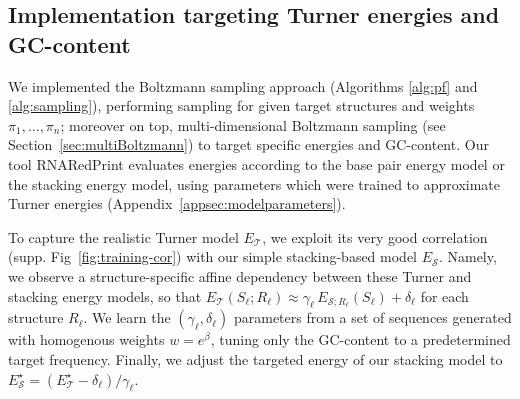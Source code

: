 \documentclass{bioinfo}
\newcommand{\Nuc}[1]{{\sf #1}}
\newcommand{\Cb}{\Nuc{C}}
\newcommand{\Gb}{\Nuc{G}}
\newcommand{\GCb}{\Gb\Cb}
\newcommand{\Software}[1]{{\ttfamily #1}}
\newcommand{\ourprog}{\Software{RNARedPrint}}
\begin{document}
\subsection{Implementation targeting Turner energies and GC-content}
We implemented the Boltzmann sampling approach (Algorithms
\ref{alg:pf} and \ref{alg:sampling}), performing sampling for given
target structures and weights $\pi_1,\dots,\pi_n$; moreover on top,
multi-dimensional Boltzmann sampling (see
Section~\ref{sec:multiBoltzmann}) to target specific energies and
\GCb-content.  Our tool \ourprog{} evaluates energies according to the base
pair energy model or the stacking energy model, using parameters which
were trained to approximate Turner energies
(Appendix~\ref{appsec:modelparameters}).
%
%

To capture the realistic Turner model $E_{\mathcal{T}}$, we exploit its very good correlation (supp. Fig~\ref{fig:training-cor}) with our simple stacking-based model $E_{\mathcal{S}}$. Namely, we observe a structure-specific affine dependency between these Turner and stacking energy models, so that $E_{\mathcal{T}}(S_\ell;R_\ell) \approx \gamma_\ell\, E_{\mathcal{S};R_\ell}(S_\ell) + \delta_\ell$ for each structure $R_\ell$. We learn the $(\gamma_\ell,\delta_\ell)$ parameters from a set of sequences generated with homogenous weights $w=e^{\beta}$, tuning only the \GCb-content to a predetermined target frequency.  Finally, we adjust the targeted energy of our stacking model to $E_{\mathcal{S}}^{\star} = (E_{\mathcal{T}}^{\star}- \delta_\ell)/\gamma_\ell$.
\end{document}
